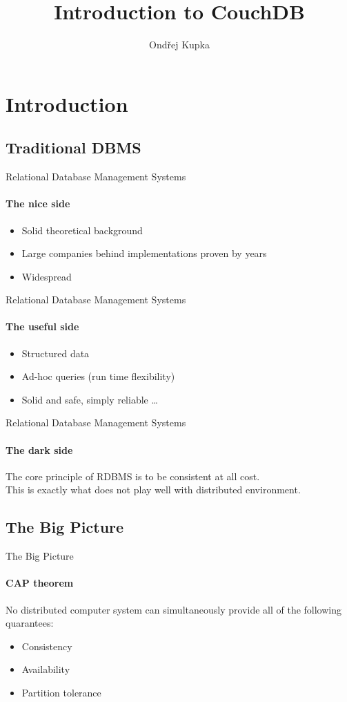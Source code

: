 \documentclass{beamer}
\title{Introduction to CouchDB}
\author{Ondřej Kupka}
\begin{document}
\begin{frame}
\titlepage
\end{frame}

\section{Introduction}
\subsection{Traditional DBMS}
\begin{frame}{Relational Database Management Systems}
  \framesubtitle{The nice side}
  \begin{itemize}
    \item Solid theoretical background
    \item Large companies behind implementations proven by years
    \item Widespread
  \end{itemize}
\end{frame}

\begin{frame}{Relational Database Management Systems}
  \framesubtitle{The useful side}
  \begin{itemize}
    \item Structured data
    \item Ad-hoc queries (run time flexibility)
    \item Solid and safe, simply reliable \ldots
  \end{itemize}
\end{frame}

\begin{frame}{Relational Database Management Systems}
  \framesubtitle{The dark side}
  The core principle of RDBMS is to be consistent at all cost. \\
  This is exactly what does not play well with distributed environment.
\end{frame}

\subsection{The Big Picture}
\begin{frame}{The Big Picture}
  \framesubtitle{CAP theorem}
  No distributed computer system can simultaneously provide all of
  the following quarantees:
  \begin{itemize}
    \item Consistency
    \item Availability
    \item Partition tolerance
  \end{itemize}
\end{frame}
\end{document}
